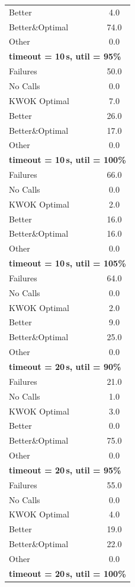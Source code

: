 \begin{tabular}{l c}
Better & 4.0 \\
Better\&Optimal & 74.0 \\
Other & 0.0 \\
\midrule
\multicolumn{2}{l}{\textbf{timeout = 10\,s, util = 95\%}} \\
\midrule
Failures & 50.0 \\
No Calls & 0.0 \\
KWOK Optimal & 7.0 \\
Better & 26.0 \\
Better\&Optimal & 17.0 \\
Other & 0.0 \\
\midrule
\multicolumn{2}{l}{\textbf{timeout = 10\,s, util = 100\%}} \\
\midrule
Failures & 66.0 \\
No Calls & 0.0 \\
KWOK Optimal & 2.0 \\
Better & 16.0 \\
Better\&Optimal & 16.0 \\
Other & 0.0 \\
\midrule
\multicolumn{2}{l}{\textbf{timeout = 10\,s, util = 105\%}} \\
\midrule
Failures & 64.0 \\
No Calls & 0.0 \\
KWOK Optimal & 2.0 \\
Better & 9.0 \\
Better\&Optimal & 25.0 \\
Other & 0.0 \\
\midrule
\multicolumn{2}{l}{\textbf{timeout = 20\,s, util = 90\%}} \\
\midrule
Failures & 21.0 \\
No Calls & 1.0 \\
KWOK Optimal & 3.0 \\
Better & 0.0 \\
Better\&Optimal & 75.0 \\
Other & 0.0 \\
\midrule
\multicolumn{2}{l}{\textbf{timeout = 20\,s, util = 95\%}} \\
\midrule
Failures & 55.0 \\
No Calls & 0.0 \\
KWOK Optimal & 4.0 \\
Better & 19.0 \\
Better\&Optimal & 22.0 \\
Other & 0.0 \\
\midrule
\multicolumn{2}{l}{\textbf{timeout = 20\,s, util = 100\%}} \\

\end{tabular}

